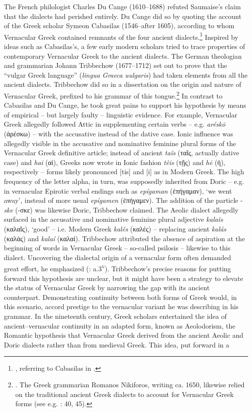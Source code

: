 The French philologist Charles Du Cange (1610–1688) refuted Saumaise’s claim that the dialects had perished entirely. Du Cange did so by quoting the account of the Greek scholar Symeon Cabasilas (1546–after 1605), according to whom Vernacular Greek contained remnants of the four ancient dialects.\footnote{ \citet[viii]{Du1688}, referring to Cabasilas in \citet[462]{Crusius1584}.} Inspired by ideas such as Cabasilas’s, a few early modern scholars tried to trace properties of contemporary Vernacular Greek to the ancient dialects. The German theologian and grammarian Johann Tribbechow (1677–1712) set out to prove that the “vulgar Greek language” (\textit{lingua Graeca uulgaris}) had taken elements from all the ancient dialects. Tribbechow did so in a dissertation on the origin and nature of Vernacular Greek, prefixed to his grammar of this tongue.\footnote{\citet[a.3\textsc{\textsuperscript{r}}]{Tribbechow1705}. The Greek grammarian Romanos Nikiforos, writing ca. 1650, likewise relied on the traditional ancient Greek dialects to account for Vernacular Greek forms (see e.g. \citealt{Nikiforos1908}: 40, 45).} In contrast to Cabasilas and Du Cange, he took great pains to support his hypothesis by means of empirical – but largely faulty – linguistic evidence. For example, Vernacular Greek allegedly followed Attic in supplementing certain verbs – e.g. \textit{aréskō} (ἀρέσκω) – with the accusative instead of the dative case. Ionic influence was allegedly visible in the accusative and nominative feminine plural forms of the Vernacular Greek definitive article; instead of ancient \textit{taîs} (ταῖς, actually dative case) and \textit{hai} (αἱ), Greeks now wrote in Ionic fashion \textit{têis} (τῇς) and \textit{hē} (ἡ), respectively – forms likely pronounced [tis] and [i] as in Modern Greek. The high frequency of the letter alpha, in turn, was supposedly inherited from Doric – e.g. in vernacular Epirotic verbal endings such as \textit{epígaman} (ἐπήγαμαν), ‘we went away’, instead of more usual \textit{epígamen} (ἐπήγαμεν). The addition of the particle -\textit{ske} (-σκε) was likewise Doric, Tribbechow claimed. The Aeolic dialect allegedly surfaced in the accusative and nominative feminine plural adjective \textit{kalaîs} (καλαῖς), ‘good’ – i.e. Modern Greek \textit{kalés} (καλές) – replacing ancient \textit{kalás} (καλάς) and \textit{kalaí} (καλαί). Tribbechow attributed the absence of aspiration at the beginning of words in Vernacular Greek – so-called psilosis – likewise to this dialect. Uncovering the dialectal origin of a vernacular form often demanded great effort, he emphasized (\citealt{Tribbechow1705}: a.3\textsc{\textsuperscript{v}}). Tribbechow’s precise reasons for putting forward this hypothesis are unclear, but it might have been a strategy to elevate the status of Vernacular Greek by narrowing the gap with its ancient counterpart. Demonstrating continuity between both forms of Greek would, in this scenario, accord prestige to the vernacular variant he was describing in his grammar. In the nineteenth century, Greek scholars entertained the idea of ancient–vernacular continuity in an adapted form, known as Aeolodorism, the Romantic hypothesis that Vernacular Greek derived from the ancient Aeolic and Doric dialects rather than from medieval Greek. This idea, put forward in a 